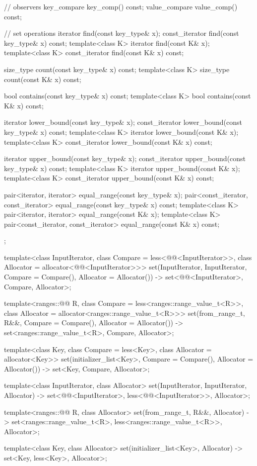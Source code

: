 \begin{codeblock}
{{    // observers
    key_compare key_comp() const;
    value_compare value_comp() const;

    // set operations
    iterator       find(const key_type& x);
    const_iterator find(const key_type& x) const;
    template<class K> iterator       find(const K& x);
    template<class K> const_iterator find(const K& x) const;

    size_type      count(const key_type& x) const;
    template<class K> size_type count(const K& x) const;

    bool           contains(const key_type& x) const;
    template<class K> bool contains(const K& x) const;

    iterator       lower_bound(const key_type& x);
    const_iterator lower_bound(const key_type& x) const;
    template<class K> iterator       lower_bound(const K& x);
    template<class K> const_iterator lower_bound(const K& x) const;

    iterator       upper_bound(const key_type& x);
    const_iterator upper_bound(const key_type& x) const;
    template<class K> iterator       upper_bound(const K& x);
    template<class K> const_iterator upper_bound(const K& x) const;

    pair<iterator, iterator>               equal_range(const key_type& x);
    pair<const_iterator, const_iterator>   equal_range(const key_type& x) const;
    template<class K>
      pair<iterator, iterator>             equal_range(const K& x);
    template<class K>
      pair<const_iterator, const_iterator> equal_range(const K& x) const;
  };

  template<class InputIterator,
           class Compare = less<@@<InputIterator>>,
           class Allocator = allocator<@@<InputIterator>>>
    set(InputIterator, InputIterator,
        Compare = Compare(), Allocator = Allocator())
      -> set<@@<InputIterator>, Compare, Allocator>;

  template<ranges::@@ R, class Compare = less<ranges::range_value_t<R>>,
           class Allocator = allocator<ranges::range_value_t<R>>>
    set(from_range_t, R&&, Compare = Compare(), Allocator = Allocator())
      -> set<ranges::range_value_t<R>, Compare, Allocator>;

  template<class Key, class Compare = less<Key>, class Allocator = allocator<Key>>
    set(initializer_list<Key>, Compare = Compare(), Allocator = Allocator())
      -> set<Key, Compare, Allocator>;

  template<class InputIterator, class Allocator>
    set(InputIterator, InputIterator, Allocator)
      -> set<@@<InputIterator>,
             less<@@<InputIterator>>, Allocator>;

  template<ranges::@@ R, class Allocator>
    set(from_range_t, R&&, Allocator)
      -> set<ranges::range_value_t<R>, less<ranges::range_value_t<R>>, Allocator>;

  template<class Key, class Allocator>
    set(initializer_list<Key>, Allocator) -> set<Key, less<Key>, Allocator>;
}
\end{codeblock}%
